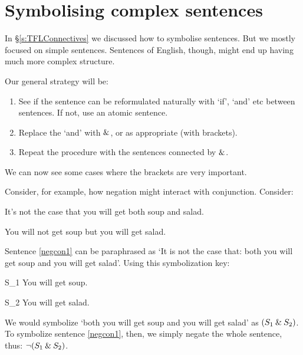 \chapter{Symbolising complex sentences}\label{s:SymbolisingComplexTFL}
In \S\ref{s:TFLConnectives} we discussed how to symbolise sentences. But we mostly focused on simple sentences. Sentences of English, though, might end up having much more complex structure.


Our general strategy will be:
\begin{highlighted}
\begin{enumerate}
\item See if the sentence can be reformulated naturally with `if', `and' etc between sentences. If not, use an atomic sentence.
\item Replace the `and' with $\mathbin{\&}$, or as appropriate (with brackets).
\item Repeat the procedure with the sentences connected by $\mathbin{\&}$.
\end{enumerate}
\end{highlighted}



We can now see some cases where the brackets are very important.

Consider, for example, how negation might interact with conjunction. Consider:
	\begin{earg}
		\item[\ex{negcon1}] It's not the case that you will get both soup and salad.
		\item[\ex{negcon2}] You will not get soup but you will get salad.
	\end{earg}
Sentence \ref{negcon1} can be paraphrased as `It is not the case that: both you will get soup and you will get salad'. Using this symbolization key:
	\begin{ekey}
		\item[S_1] You will get soup.
		\item[S_2] You will get salad.
	\end{ekey}
We would symbolize `both you will get soup and you will get salad' as $(S_1 \mathbin{\&} S_2)$. To symbolize sentence \ref{negcon1}, then, we simply negate the whole sentence, thus: $\neg (S_1 \mathbin{\&} S_2)$.

